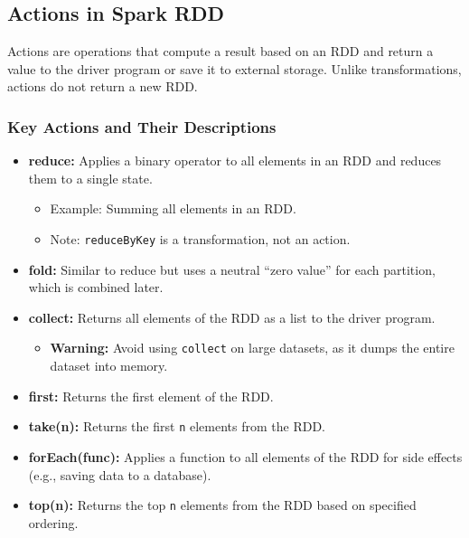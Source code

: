 \documentclass[12pt]{article}
\begin{document}
\subsection{Actions in Spark RDD}

Actions are operations that compute a result based on an RDD and return a value to the driver program or save it to external storage. Unlike transformations, actions do not return a new RDD.

\subsubsection*{Key Actions and Their Descriptions}

\begin{itemize}
    \item \textbf{reduce:} Applies a binary operator to all elements in an RDD and reduces them to a single state.
    \begin{itemize}
        \item Example: Summing all elements in an RDD.
        \item Note: \texttt{reduceByKey} is a transformation, not an action.
    \end{itemize}
    
    \item \textbf{fold:} Similar to reduce but uses a neutral “zero value” for each partition, which is combined later.
    
    \item \textbf{collect:} Returns all elements of the RDD as a list to the driver program.
    \begin{itemize}
        \item \textbf{Warning:} Avoid using \texttt{collect} on large datasets, as it dumps the entire dataset into memory.
    \end{itemize}
    
    \item \textbf{first:} Returns the first element of the RDD.
    
    \item \textbf{take(n):} Returns the first \texttt{n} elements from the RDD.
    
    \item \textbf{forEach(func):} Applies a function to all elements of the RDD for side effects (e.g., saving data to a database).
    
    \item \textbf{top(n):} Returns the top \texttt{n} elements from the RDD based on specified ordering.
    

\end{itemize}
\end{document}
